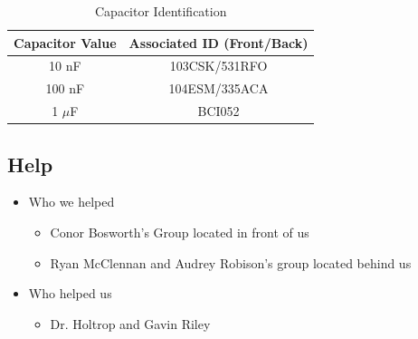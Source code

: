 \documentclass{article}
\begin{document}
\begin{table}[h!]
    \centering
    \begin{tabular}{|c|c|}
        \hline
        Capacitor Value & Associated ID (Front/Back)\\
        \hline
        10 nF & 103CSK/531RFO\\
        \hline
        100 nF & 104ESM/335ACA\\
        \hline
        1 $\mu$F & BCI052\protect\footnotemark\\
        \hline
    \end{tabular}
    \caption{Capacitor Identification}
    \label{tab:Capacitor Identification}
\end{table}
\subsection{Help}
\begin{itemize}
    \item{\fontsize{11pt}{13.6pt}\selectfont Who we helped}
    \begin{itemize}[label=$\circ$]
        \item Conor Bosworth's Group located in front of us
        \item Ryan McClennan and Audrey Robison's group located behind us
    \end{itemize}
    \item{\fontsize{11pt}{13.6pt}\selectfont Who helped us}
    \begin{itemize}[label=$\circ$]
        \item Dr. Holtrop and Gavin Riley
    \end{itemize}
\end{itemize}
\end{document}
